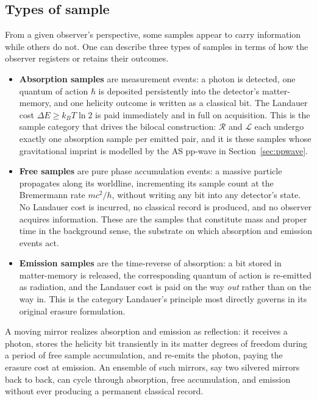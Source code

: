 \documentclass[12pt,a4paper]{article}
\begin{document}
\subsection{Types of sample}

From a given observer’s perspective, some samples appear to carry information while others do not. One can describe three types of samples in terms of how the observer registers or retains their outcomes.

\begin{itemize}
\item {\bf Absorption samples} are measurement events: a photon is 
detected, one quantum of action $\hbar$ is deposited persistently into the 
detector's matter-memory, and one helicity outcome is written as a classical 
bit. The Landauer cost $\Delta E \geq k_B T \ln 2$ is paid immediately and 
in full on acquisition. This is the sample category that drives the bilocal 
construction: $\mathcal{R}$ and $\mathcal{L}$ each undergo exactly one absorption sample per 
emitted pair, and it is these samples whose gravitational imprint is modelled 
by the AS pp-wave in Section~\ref{sec:ppwave}.

\item {\bf Free samples} are pure phase accumulation events: a massive particle 
propagates along its worldline, incrementing its sample count at the Bremermann 
rate $mc^2/h$, without writing any bit into any detector's state. No Landauer 
cost is incurred, no classical record is produced, and no observer acquires 
information. These are the samples that constitute mass and proper time in the 
background sense, the substrate on which absorption and emission events act.

\item {\bf Emission samples} are the time-reverse of absorption: a bit stored in 
matter-memory is released, the corresponding quantum of action is re-emitted 
as radiation, and the Landauer cost is paid on the way \emph{out} rather than 
on the way in. This is the category Landauer's principle most directly 
governs in its original erasure formulation.
\end{itemize}

A moving mirror realizes absorption and emission as reflection: it
receives a photon, stores the helicity bit transiently in its 
matter degrees of freedom during a period of free sample accumulation, and 
re-emits the photon, paying the erasure cost at emission. An ensemble of 
such mirrors, say two silvered mirrors  back to back, can cycle through absorption, free accumulation, and 
emission without ever producing a permanent classical record.
\end{document}
